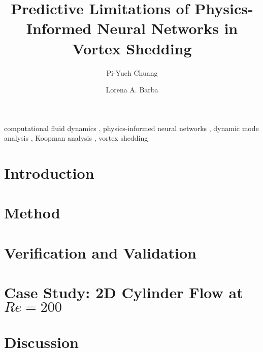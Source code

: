 \documentclass[5p, twocolumn, times, sort&compress]{elsarticle}
\begin{document}
    \begin{frontmatter}
        \title{%
        Predictive Limitations of Physics-Informed Neural Networks in Vortex Shedding%
        }

        \author[1]{Pi-Yueh Chuang}
        \author[1]{Lorena A. Barba}

        \begin{abstract}
            \lipsum[1]%
        \end{abstract}

        \begin{keyword}
            computational fluid dynamics \sep
            physics-informed neural networks \sep
            dynamic mode analysis \sep
            Koopman analysis \sep
            vortex shedding
        \end{keyword}
    \end{frontmatter}

    \section{Introduction}
    

    \section{Method}
    

    \section{Verification and Validation}
    
    

    \section{Case Study: 2D Cylinder Flow at $Re=\num{200}$}\label{sec:case-study}
    

    \section{Discussion}
    
\end{document}
